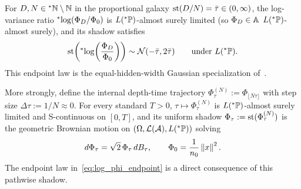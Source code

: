 \begin{theorem}\label{thm:scalar_linear_var}
For $D, N \in {}^*\mathbb{N} \setminus \mathbb{N}$ in the proportional galaxy $\operatorname{st}(D/N) = \bar{\tau} \in (0, \infty)$, the log-variance ratio ${}^*\!\log(\Phi_D/\Phi_0)$ is $L({}^*\mathbb{P})$-almost surely limited (so $\Phi_D \in \mathbb{A}$ $L({}^*\mathbb{P})$-almost surely), and its shadow satisfies
\begin{equation}\label{eq:log_phi_endpoint}
\operatorname{st}\!\left({}^*\!\log\!\left(\frac{\Phi_D}{\Phi_0}\right)\right) \sim \mathcal{N}(-\bar{\tau}, 2\bar{\tau}) \qquad \text{under } L({}^*\mathbb{P}).
\end{equation}
This endpoint law is the equal-hidden-width Gaussian specialization of~\cite[Theorem~1 and Eq.~(9)]{hanin2020products}.

More strongly, define the internal depth-time trajectory $\Phi_\tau^{(N)} := \Phi_{\lfloor N\tau \rfloor}$ with step size $\Delta\tau := 1/N \approx 0$. For every standard $T > 0$, $\tau \mapsto \Phi_\tau^{(N)}$ is $L({}^*\mathbb{P})$-almost surely limited and S-continuous on $[0, T]$, and its uniform shadow $\Phi_\tau := \operatorname{st}(\Phi_\tau^{(N)})$ is the geometric Brownian motion on $(\Omega, \mathcal{L}(\mathcal{A}), L({}^*\mathbb{P}))$ solving
\begin{equation}\label{eq:scalar_gbm}
d\Phi_\tau = \sqrt{2}\,\Phi_\tau\,dB_\tau, \qquad \Phi_0 = \frac{1}{n_0}\left\lVert x \right\rVert^2.
\end{equation}
The endpoint law in~\eqref{eq:log_phi_endpoint} is a direct consequence of this pathwise shadow.
\end{theorem}

